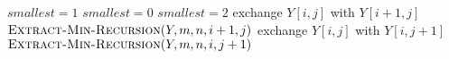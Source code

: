 \documentclass[12pt,reqno]{amsart}
\begin{document}
\begin{enumerate}[1.]
\begin{enumerate}[a.]
    \begin{algorithm}
        \caption{$\textsc{Extract-Min-Recursion}(Y, m, n, i, j)$}
        \begin{algorithmic}[1]
                \STATE $smallest = 1$
            \ELSE
                \STATE $smallest = 0$
            \ENDIF
                \STATE $smallest = 2$
            \ENDIF
                \RETURN
            \ENDIF
                \STATE exchange $Y[i, j]$ with $Y[i + 1, j]$
                \STATE $\textsc{Extract-Min-Recursion}(Y, m, n, i + 1, j)$
            \ELSE
                \STATE exchange $Y[i, j]$ with $Y[i, j + 1]$
                \STATE $\textsc{Extract-Min-Recursion}(Y, m, n, i, j + 1)$
            \ENDIF
        \end{algorithmic}
    \end{algorithm}


\end{enumerate}
\end{enumerate}
\end{document}
